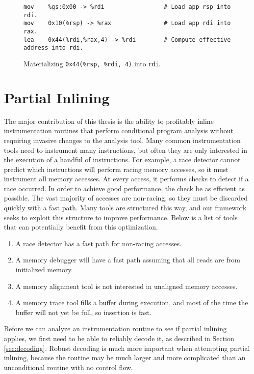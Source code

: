 \begin{figure}
\begin{verbatim}
mov    %gs:0x00 -> %rdi                 # Load app rsp into rdi.
mov    0x10(%rsp) -> %rax               # Load app rdi into rax.
lea    0x44(%rdi,%rax,4) -> %rdi        # Compute effective address into rdi.
\end{verbatim}
\caption{Materializing {\tt 0x44(\%rsp, \%rdi, 4)} into {\tt rdi}.}
\label{fig:arg_mat_lea}
\end{figure}

\section{Partial Inlining}
\label{sec:partial_inlining}

The major contribution of this thesis is the ability to profitably inline
instrumentation routines that perform conditional program analysis without
requiring invasive changes to the analysis tool.  Many common instrumentation
tools need to instrument many instructions, but often they are only interested
in the execution of a handful of instructions.  For example, a race detector
cannot predict which instructions will perform racing memory accesses, so it
must instrument all memory accesses.  At every access, it performs checks to
detect if a race occurred.  In order to achieve good performance, the check be
as efficient as possible.  The vast majority of accesses are non-racing, so they
must be discarded quickly with a fast path.  Many tools are structured this way,
and our framework seeks to exploit this structure to improve performance.  Below
is a list of tools that can potentially benefit from this optimization.

\begin{enumerate}
\item A race detector has a fast path for non-racing accesses.
\item A memory debugger will have a fast path assuming that all reads are from
initialized memory.
\item A memory alignment tool is not interested in unaligned memory accesses.
\item A memory trace tool fills a buffer during execution, and most of the time
the buffer will not yet be full, so insertion is fast.
\end{enumerate}

Before we can analyze an instrumentation routine to see if partial inlining
applies, we first need to be able to reliably decode it, as described in Section
\ref{sec:decoding}.  Robust decoding is much more important when attempting
partial inlining, because the routine may be much larger and more complicated
than an unconditional routine with no control flow.

